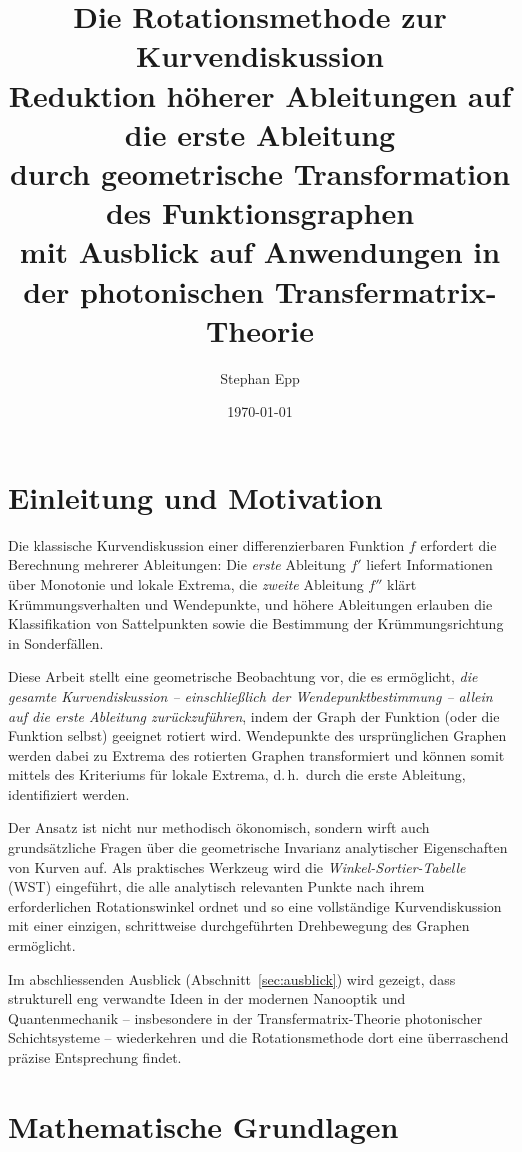 ﻿\documentclass[12pt, a4paper]{article}
\title{
	\textbf{Die Rotationsmethode zur Kurvendiskussion} \\
	\large Reduktion höherer Ableitungen auf die erste Ableitung \\
	durch geometrische Transformation des Funktionsgraphen \\[1ex]
	\normalsize mit Ausblick auf Anwendungen in der photonischen Transfermatrix-Theorie
}
\author{Stephan Epp}
\date{\today}
\theoremstyle{definition}
\begin{document}
	
	\maketitle
	\tableofcontents
	\newpage
	
	\section{Einleitung und Motivation}
	
	Die klassische Kurvendiskussion einer differenzierbaren Funktion $f$ erfordert
	die Berechnung mehrerer Ableitungen: Die \emph{erste} Ableitung $f'$ liefert
	Informationen über Monotonie und lokale Extrema, die \emph{zweite} Ableitung
	$f''$ klärt Krümmungsverhalten und Wendepunkte, und höhere Ableitungen
	erlauben die Klassifikation von Sattelpunkten sowie die Bestimmung der
	Krümmungsrichtung in Sonderfällen.
	
	Diese Arbeit stellt eine geometrische Beobachtung vor, die es ermöglicht,
	\emph{die gesamte Kurvendiskussion -- einschließlich der Wendepunktbestimmung
		-- allein auf die erste Ableitung zurückzuführen}, indem der Graph der
	Funktion (oder die Funktion selbst) geeignet rotiert wird. Wendepunkte des
	ursprünglichen Graphen werden dabei zu Extrema des rotierten Graphen
	transformiert und können somit mittels des Kriteriums für lokale Extrema,
	d.\,h.\ durch die erste Ableitung, identifiziert werden.
	
	Der Ansatz ist nicht nur methodisch ökonomisch, sondern wirft auch
	grundsätzliche Fragen über die geometrische Invarianz analytischer
	Eigenschaften von Kurven auf. Als praktisches Werkzeug wird die
	\emph{Winkel-Sortier-Tabelle} (WST) eingeführt, die alle analytisch
	relevanten Punkte nach ihrem erforderlichen Rotationswinkel ordnet und
	so eine vollständige Kurvendiskussion mit einer einzigen, schrittweise
	durchgeführten Drehbewegung des Graphen ermöglicht.
	
	Im abschliessenden Ausblick (Abschnitt~\ref{sec:ausblick}) wird gezeigt,
	dass strukturell eng verwandte Ideen in der modernen Nanooptik und
	Quantenmechanik -- insbesondere in der Transfermatrix-Theorie photonischer
	Schichtsysteme -- wiederkehren und die Rotationsmethode dort eine
	überraschend präzise Entsprechung findet.
	
	\section{Mathematische Grundlagen}
	
\end{document}
